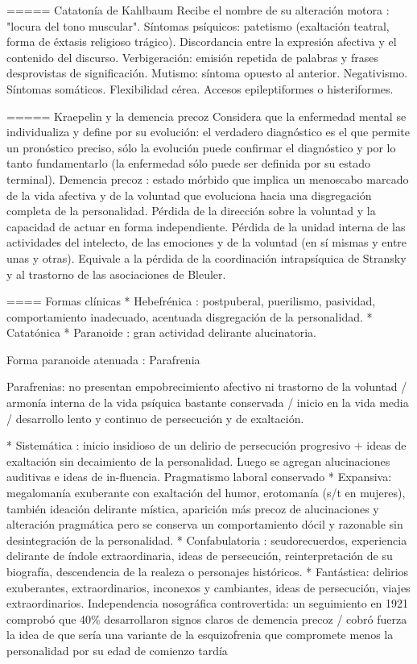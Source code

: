 \documentclass{scrbook}
\begin{document}
===== Catatonía de Kahlbaum
Recibe el nombre de su alteración motora : "locura del tono muscular". Síntomas psíquicos: patetismo (exaltación teatral, forma de éxtasis religioso trágico). Discordancia entre la expresión afectiva y el contenido del discurso. Verbigeración: emisión repetida de palabras y frases desprovistas de significación. Mutismo: síntoma opuesto al anterior. Negativismo. Síntomas somáticos. Flexibilidad cérea. Accesos epileptiformes o histeriformes.

===== Kraepelin y la demencia precoz
Considera que la enfermedad mental se individualiza y define por su evolución: el verdadero diagnóstico es el que permite un pronóstico preciso, sólo la evolución puede confirmar el diagnóstico y por lo tanto fundamentarlo (la enfermedad sólo puede ser definida por su estado terminal). Demencia precoz : estado mórbido que implica un menoscabo marcado de la vida afectiva y de la voluntad que evoluciona hacia una disgregación completa de la personalidad. Pérdida de la dirección sobre la voluntad y la capacidad de actuar en forma independiente. Pérdida de la unidad interna de las actividades del intelecto, de las emociones y de la voluntad (en sí mismas y entre unas y otras). Equivale a la pérdida de la coordinación intrapsíquica de Stransky y al trastorno de las asociaciones de Bleuler.

==== Formas clínicas
* Hebefrénica : postpuberal, puerilismo, pasividad, comportamiento inadecuado, acentuada disgregación de la personalidad.
* Catatónica
* Paranoide : gran actividad delirante alucinatoria.

Forma paranoide atenuada : Parafrenia

Parafrenias: no presentan empobrecimiento afectivo ni trastorno de la voluntad / armonía interna de la vida psíquica bastante conservada / inicio en la vida media / desarrollo lento y continuo de persecución y de exaltación.

* Sistemática : inicio insidioso de un delirio de persecución progresivo + ideas de exaltación sin decaimiento de la personalidad. Luego se agregan alucinaciones auditivas e ideas de in-fluencia. Pragmatismo laboral conservado
* Expansiva: megalomanía exuberante con exaltación del humor, erotomanía (s/t en mujeres), también ideación delirante mística, aparición más precoz de alucinaciones y alteración pragmática pero se conserva un comportamiento dócil y razonable sin desintegración de la personalidad.
* Confabulatoria : seudorecuerdos, experiencia delirante de índole extraordinaria, ideas de persecución, reinterpretación de su biografía, descendencia de la realeza o personajes históricos.
* Fantástica: delirios exuberantes, extraordinarios, inconexos y cambiantes, ideas de persecución, viajes extraordinarios. Independencia nosográfica controvertida: un seguimiento en 1921 comprobó que 40\% desarrollaron signos claros de demencia precoz / cobró fuerza la idea de que sería una variante de la esquizofrenia que compromete menos la personalidad por su edad de comienzo tardía
\end{document}
